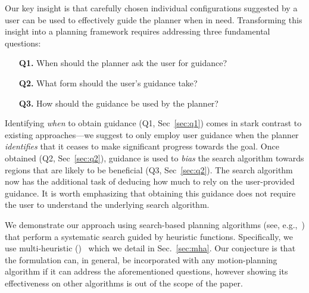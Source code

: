 \documentclass{article}
\begin{document}
Our key insight is that carefully chosen individual configurations suggested by a user can be used to effectively guide the planner when in need.
Transforming this insight into a planning framework requires addressing three fundamental questions:

\begin{itemize}
	\item[\textbf{Q1.}] When should the planner ask the user for guidance?
	\item[\textbf{Q2.}] What form should the user's guidance take?
	\item[\textbf{Q3.}] How should the guidance be used by the planner?
\end{itemize}

Identifying \emph{when} to obtain guidance 
(Q1, Sec~\ref{sec:q1}) 
comes in stark contrast to existing approaches---we suggest to only employ user guidance when the planner \emph{identifies} that it ceases to make significant progress towards the goal.
Once obtained (Q2, Sec~\ref{sec:q2}), guidance is used to \emph{bias} the search algorithm towards regions that are likely to be beneficial (Q3, Sec~\ref{sec:q2}). 
The search algorithm now has the additional task of deducing how much to rely on the user-provided guidance.
It is worth emphasizing that obtaining this guidance does not require the user to understand the underlying search algorithm. 

% 



%
We demonstrate our approach using search-based planning algorithms (see, e.g.,~\cite{CCL14}) that perform a systematic search guided by heuristic functions.
Specifically, we use multi-heuristic \astar (\mhastar)~\cite{ASNHL16,NAL15} which we detail in Sec.~\ref{sec:mha}.
Our conjecture is that the formulation can, in general, be incorporated with any motion-planning algorithm if it can address the aforementioned questions, however showing its effectiveness on other algorithms is out of the scope of the paper.
\end{document}
